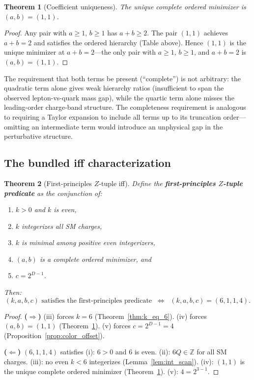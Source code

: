 \documentclass[11pt,a4paper]{article}
\newtheorem{theorem}{Theorem}[section]
\theoremstyle{definition}
\theoremstyle{remark}
\newcommand{\Zidx}{Z}
\begin{document}
\begin{theorem}[Coefficient uniqueness]
\label{thm:ab_unique}
The unique complete ordered minimizer is $(a, b) = (1, 1)$.
\end{theorem}

\begin{proof}
Any pair with $a \geq 1$, $b \geq 1$ has $a + b \geq 2$.  The pair
$(1, 1)$ achieves $a + b = 2$ and satisfies the ordered hierarchy
(Table above).  Hence $(1, 1)$ is the unique minimizer at
$a + b = 2$---the only pair with $a \geq 1$, $b \geq 1$, and $a + b = 2$
is $(a, b) = (1, 1)$.
\end{proof}

\noindent
The requirement that both terms be present (``complete'') is not arbitrary:
the quadratic term alone gives weak hierarchy ratios (insufficient to span
the observed lepton-vs-quark mass gap), while the quartic term alone misses
the leading-order charge-band structure.  The completeness requirement is
analogous to requiring a Taylor expansion to include all terms up to its
truncation order---omitting an intermediate term would introduce an unphysical
gap in the perturbative structure.

\subsection{The bundled iff characterization}

\begin{theorem}[First-principles $\Zidx$-tuple iff]
\label{thm:Z_iff}
Define the \textbf{first-principles $\Zidx$-tuple predicate} as the
conjunction of:
\begin{enumerate}[nosep,label=(\roman*)]
  \item $k > 0$ and $k$ is even,
  \item $k$ integerizes all SM charges,
  \item $k$ is minimal among positive even integerizers,
  \item $(a, b)$ is a complete ordered minimizer, and
  \item $c = 2^{D-1}$.
\end{enumerate}
Then:
\begin{equation}
  \boxed{(k, a, b, c)
  \text{ satisfies the first-principles predicate}
  \;\;\Longleftrightarrow\;\;
  (k, a, b, c) = (6, 1, 1, 4).}
  \label{eq:Z_iff}
\end{equation}
\end{theorem}

\begin{proof}
\textbf{($\Rightarrow$)}\;
(iii) forces $k = 6$ (Theorem~\ref{thm:k_eq_6}).
(iv) forces $(a, b) = (1, 1)$ (Theorem~\ref{thm:ab_unique}).
(v) forces $c = 2^{D-1} = 4$ (Proposition~\ref{prop:color_offset}).

\textbf{($\Leftarrow$)}\;
$(6, 1, 1, 4)$ satisfies (i): $6 > 0$ and $6$ is even.
(ii): $6Q \in \mathbb{Z}$ for all SM charges.
(iii): no even $k < 6$ integerizes (Lemma~\ref{lem:int_scan}).
(iv): $(1, 1)$ is the unique complete ordered minimizer
(Theorem~\ref{thm:ab_unique}).
(v): $4 = 2^{3-1}$.
\end{proof}
\end{document}
